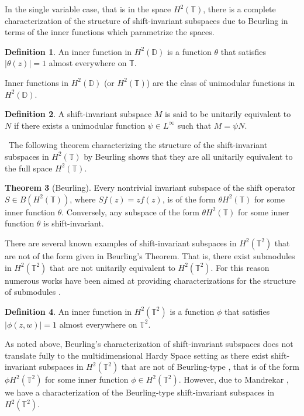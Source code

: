\documentclass[12pt,reqno]{amsart}
\theoremstyle{definition}
\newtheorem{theorem}{Theorem} [section]
\theoremstyle{definition}
\newtheorem{definition}[theorem]{Definition}
\numberwithin{equation}{section}
\begin{document}
\newline
In the single variable case, that is in the space $H^2(\mathbb{T})$, there is a complete characterization of the structure of shift-invariant subspaces due to Beurling in terms of the inner functions which parametrize the spaces.  
  \begin{definition}
      An inner function in $H^2(\mathbb{D})$ is a function $\theta$ that satisfies $| \theta (z)| = 1$ almost everywhere on $\mathbb{T}$.
\end{definition}
Inner functions in $H^2(\mathbb{D})$ (or $H^2(\mathbb{T})$) are the class of unimodular functions in $H^2(\mathbb{D})$.
\begin{definition}
    A shift-invariant subspace $M$ is said to be unitarily equivalent to $N$ if there exists a unimodular function $\psi \in L^\infty$ such that $M =\psi N $.
\end{definition}
 \quad \, The following theorem characterizing the structure of the shift-invariant subspaces in $H^2(\mathbb{T})$ by Beurling \cite{B48} shows that they  are all unitarily equivalent to the full space $H^2(\mathbb{T})$.
 
   \begin{theorem}[Beurling]
    Every nontrivial invariant subspace of the shift operator $S \in B(H^2(\mathbb{T})) $, where $Sf(z) = zf(z)$, is of the form $\theta H^2(\mathbb{T})$ for some inner function $\theta$. Conversely, any  subspace of the form $\theta H^2(\mathbb{T})$ for some inner function $\theta$ is shift-invariant.
    \end{theorem}

There are several known examples of shift-invariant subspaces in $H^2(\mathbb{T}^2)$ that are not of the form given in Beurling's Theorem. That is, there exist submodules in $H^2(\mathbb{T}^2)$ that are not unitarily equivalent to $H^2(\mathbb{T}^2)$. For this reason numerous works have been aimed at providing characterizations for the structure of submodules \cite{Y18}.  




\begin{definition}
  An inner function in $H^2(\mathbb{T}^2)$ is a function $\phi$ that satisfies $| \phi (z, w)| = 1$ almost everywhere on $\mathbb{T}^2$.
\end{definition}

As noted above, Beurling's characterization of shift-invariant subspaces does not translate fully to the multidimensional Hardy Space setting as there exist shift-invariant subspaces in $H^2(\mathbb{T}^2)$ that are not of Beurling-type \cite{R69}, that is of the form $\phi H^2(\mathbb{T}^2)$ for some inner function $\phi \in H^2(\mathbb{T}^2)$.  However, due to Mandrekar \cite{M88}, we have a characterization of the Beurling-type shift-invariant subspaces in $H^2(\mathbb{T}^2)$.
\end{document}
